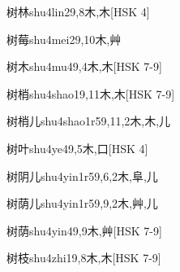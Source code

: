 \begin{EntryWithPhonetic}{树林}{shu4lin2}{9,8}{⽊,⽊}[HSK 4]
\end{EntryWithPhonetic}

\begin{EntryWithPhonetic}{树莓}{shu4mei2}{9,10}{⽊,⾋}
\end{EntryWithPhonetic}

\begin{EntryWithPhonetic}{树木}{shu4mu4}{9,4}{⽊,⽊}[HSK 7-9]
\end{EntryWithPhonetic}

\begin{EntryWithPhonetic}{树梢}{shu4shao1}{9,11}{⽊,⽊}[HSK 7-9]
\end{EntryWithPhonetic}

\begin{EntryWithPhonetic}{树梢儿}{shu4shao1r5}{9,11,2}{⽊,⽊,⼉}
\end{EntryWithPhonetic}

\begin{EntryWithPhonetic}{树叶}{shu4ye4}{9,5}{⽊,⼝}[HSK 4]
\end{EntryWithPhonetic}

\begin{EntryWithPhonetic}{树阴儿}{shu4yin1r5}{9,6,2}{⽊,⾩,⼉}
\end{EntryWithPhonetic}

\begin{EntryWithPhonetic}{树荫儿}{shu4yin1r5}{9,9,2}{⽊,⾋,⼉}
\end{EntryWithPhonetic}

\begin{EntryWithPhonetic}{树荫}{shu4yin4}{9,9}{⽊,⾋}[HSK 7-9]
\end{EntryWithPhonetic}

\begin{EntryWithPhonetic}{树枝}{shu4zhi1}{9,8}{⽊,⽊}[HSK 7-9]
\end{EntryWithPhonetic}

